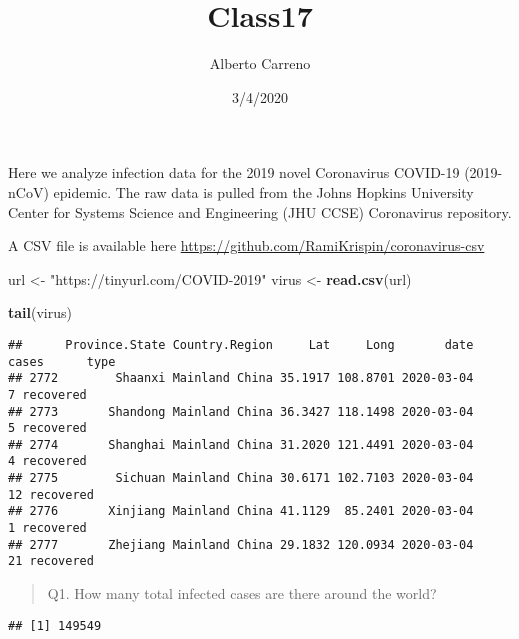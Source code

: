 \documentclass[
]{article}
\title{Class17}
\author{Alberto Carreno}
\date{3/4/2020}
\newenvironment{Shaded}{\begin{snugshade}}{\end{snugshade}}
\newcommand{\KeywordTok}[1]{\textcolor[rgb]{0.13,0.29,0.53}{\textbf{#1}}}
\newcommand{\NormalTok}[1]{#1}
\newcommand{\OperatorTok}[1]{\textcolor[rgb]{0.81,0.36,0.00}{\textbf{#1}}}
\newcommand{\StringTok}[1]{\textcolor[rgb]{0.31,0.60,0.02}{#1}}
\begin{document}
\maketitle

Here we analyze infection data for the 2019 novel Coronavirus COVID-19
(2019-nCoV) epidemic. The raw data is pulled from the Johns Hopkins
University Center for Systems Science and Engineering (JHU CCSE)
Coronavirus repository.

A CSV file is available here
\url{https://github.com/RamiKrispin/coronavirus-csv}

\begin{Shaded}
\begin{Highlighting}[]
\NormalTok{url <-}\StringTok{ "https://tinyurl.com/COVID-2019"}
\NormalTok{virus <-}\StringTok{ }\KeywordTok{read.csv}\NormalTok{(url)}

\KeywordTok{tail}\NormalTok{(virus)}
\end{Highlighting}
\end{Shaded}

\begin{verbatim}
##      Province.State Country.Region     Lat     Long       date cases      type
## 2772        Shaanxi Mainland China 35.1917 108.8701 2020-03-04     7 recovered
## 2773       Shandong Mainland China 36.3427 118.1498 2020-03-04     5 recovered
## 2774       Shanghai Mainland China 31.2020 121.4491 2020-03-04     4 recovered
## 2775        Sichuan Mainland China 30.6171 102.7103 2020-03-04    12 recovered
## 2776       Xinjiang Mainland China 41.1129  85.2401 2020-03-04     1 recovered
## 2777       Zhejiang Mainland China 29.1832 120.0934 2020-03-04    21 recovered
\end{verbatim}

\begin{quote}
Q1. How many total infected cases are there around the world?
\end{quote}

\begin{Shaded}
\end{Shaded}

\begin{verbatim}
## [1] 149549
\end{verbatim}

\begin{Shaded}
\end{Shaded}
\end{document}
